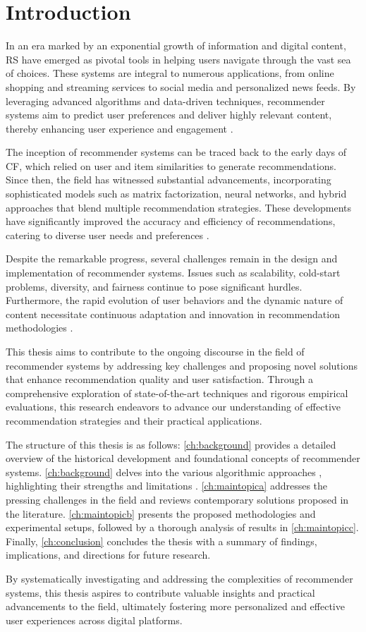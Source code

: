 \chapter{Introduction}\label{ch:introduction}

In an era marked by an exponential growth of information and digital content, \ac{RS} have emerged as pivotal tools in helping users navigate through the vast sea of choices. These systems are integral to numerous applications, from online shopping and streaming services to social media and personalized news feeds. By leveraging advanced algorithms and data-driven techniques, recommender systems aim to predict user preferences and deliver highly relevant content, thereby enhancing user experience and engagement \autocite{seneca}. 

The inception of recommender systems can be traced back to the early days of \ac{CF}, which relied on user and item similarities to generate recommendations. Since then, the field has witnessed substantial advancements, incorporating sophisticated models such as matrix factorization, neural networks, and hybrid approaches that blend multiple recommendation strategies. These developments have significantly improved the accuracy and efficiency of recommendations, catering to diverse user needs and preferences \autocite{taleb:2010}.

Despite the remarkable progress, several challenges remain in the design and implementation of recommender systems. Issues such as scalability, cold-start problems, diversity, and fairness continue to pose significant hurdles. Furthermore, the rapid evolution of user behaviors and the dynamic nature of content necessitate continuous adaptation and innovation in recommendation methodologies \autocite{adams:2013}.

This thesis aims to contribute to the ongoing discourse in the field of recommender systems by addressing key challenges and proposing novel solutions that enhance recommendation quality and user satisfaction. Through a comprehensive exploration of state-of-the-art techniques and rigorous empirical evaluations, this research endeavors to advance our understanding of effective recommendation strategies and their practical applications.

The structure of this thesis is as follows: \autoref{ch:background} provides a detailed overview of the historical development and foundational concepts of recommender systems. \autoref{ch:background} delves into the various algorithmic approaches \autocite{cormen:2001}, highlighting their strengths and limitations \autocite{knuth:1974}. \autoref{ch:maintopica} addresses the pressing challenges in the field and reviews contemporary solutions proposed in the literature. \autoref{ch:maintopicb} presents the proposed methodologies and experimental setups, followed by a thorough analysis of results in \autoref{ch:maintopicc}. Finally, \autoref{ch:conclusion} concludes the thesis with a summary of findings, implications, and directions for future research.

By systematically investigating and addressing the complexities of recommender systems, this thesis aspires to contribute valuable insights and practical advancements to the field, ultimately fostering more personalized and effective user experiences across digital platforms.